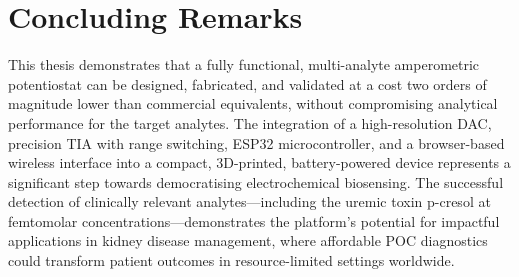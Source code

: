 \section{Concluding Remarks}
\label{sec:conclusion}

This thesis demonstrates that a fully functional, multi-analyte amperometric potentiostat can be designed, fabricated, and validated at a cost two orders of magnitude lower than commercial equivalents, without compromising analytical performance for the target analytes. The integration of a high-resolution DAC, precision TIA with range switching, ESP32 microcontroller, and a browser-based wireless interface into a compact, 3D-printed, battery-powered device represents a significant step towards democratising electrochemical biosensing. The successful detection of clinically relevant analytes—including the uremic toxin p-cresol at femtomolar concentrations—demonstrates the platform's potential for impactful applications in kidney disease management, where affordable POC diagnostics could transform patient outcomes in resource-limited settings worldwide.
